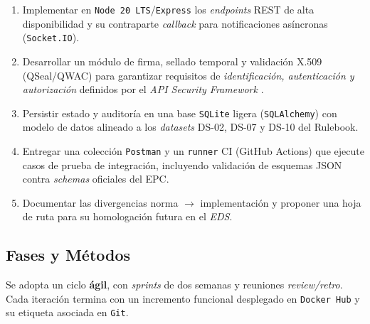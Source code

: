 \begin{enumerate}
  \item Implementar en \texttt{Node 20 LTS}/\texttt{Express} los \emph{endpoints}
        REST de alta disponibilidad y su contraparte \textit{callback} para
        notificaciones asíncronas (\texttt{Socket.IO}).
  \item Desarrollar un módulo de firma, sellado temporal y validación X.509
        (QSeal/QWAC) para garantizar requisitos de \emph{identificación,
        autenticación y autorización} definidos por el \emph{API Security
        Framework} \cite{epc164}.
  \item Persistir estado y auditoría en una base \texttt{SQLite} ligera
        (\texttt{SQLAlchemy}) con modelo de datos alineado a los \emph{datasets}
        DS-02, DS-07 y DS-10 del Rulebook.
  \item Entregar una colección \texttt{Postman} y un \texttt{runner} CI (GitHub Actions)
        que ejecute casos de prueba de integración, incluyendo validación de
        esquemas JSON contra \textit{schemas} oficiales del EPC.
  \item Documentar las divergencias norma $\rightarrow$ implementación y proponer
        una hoja de ruta para su homologación futura en el \emph{EDS}.
\end{enumerate}

\subsection{Fases y Métodos}
\label{subsec:FasesMetodos}
Se adopta un ciclo \textbf{ágil}, con \emph{sprints} de dos semanas y reuniones
\emph{review/retro}.  
Cada iteración termina con un incremento funcional desplegado en \texttt{Docker Hub}
y su etiqueta asociada en \texttt{Git}.

